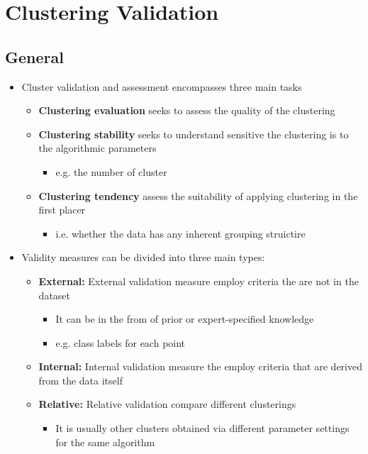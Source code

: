 \documentclass[11pt]{article}
\begin{document}
\section{Clustering Validation}
\label{sec:org90478fe}
\subsection{General}
\label{sec:orgb4a91cb}
\begin{itemize}
\item Cluster validation and assessment encompasses three main tasks
\begin{itemize}
\item \textbf{Clustering evaluation} seeks to assess the quality of the clustering
\item \textbf{Clustering stability} seeks to understand sensitive the clustering is to the algorithmic parameters
\begin{itemize}
\item e.g. the number of cluster
\end{itemize}
\item \textbf{Clustering tendency} assess the suitability of applying clustering in the first placer
\begin{itemize}
\item i.e. whether the data has any inherent grouping struictire
\end{itemize}
\end{itemize}

\item Validity measures can be divided into three main types:
\begin{itemize}
\item \textbf{External:} External validation measure employ criteria the are not in the dataset
\begin{itemize}
\item It can be in the from of prior or expert-specified knowledge
\item e.g. class labels for each point
\end{itemize}
\item \textbf{Internal:} Internal validation measure the employ criteria that are derived from the data itself
\item \textbf{Relative:} Relative validation compare different clusterings
\begin{itemize}
\item It is usually other clusters obtained via different parameter settings for the same algorithm
\end{itemize}
\end{itemize}
\end{itemize}
\end{document}
